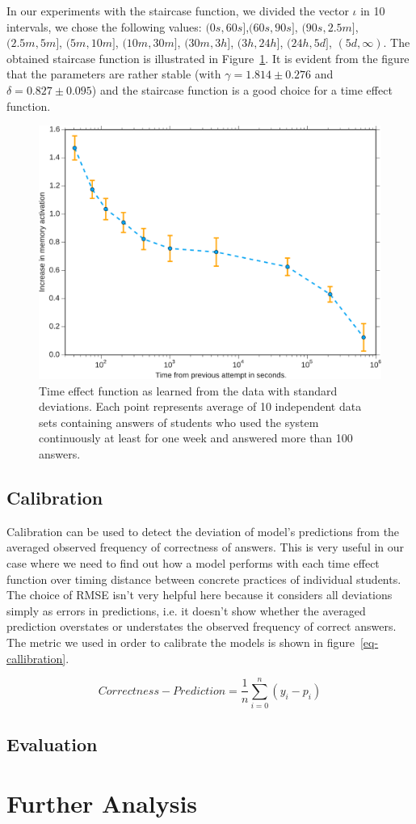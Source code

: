 In our experiments with the staircase function, we divided the vector $\iota$ in 10 intervals, we chose the following values: $(0s, 60s]$,$(60s, 90s]$, $(90s, 2.5m]$, $(2.5m, 5m]$, $(5m, 10m]$, $(10m, 30m]$, $(30m, 3h]$, $(3h, 24h]$, $(24h, 5d]$, $(5d, \infty)$. The obtained staircase function is illustrated in Figure~\ref{learned-time-effect-function}. It is evident from the figure that the parameters are rather stable (with $\gamma = 1.814 \pm 0.276$ and $\delta = 0.827 \pm 0.095$) and the staircase function is a good choice for a time effect function.

\begin{figure}[htbp]
  \centering
  \includegraphics[width=\textwidth]{img/learned-time-effect-function}
  \caption{Time effect function as learned from the data with standard deviations. Each point represents average of 10 independent data sets containing answers of students who used the system continuously at least for one week and answered more than 100 answers.}
  \label{learned-time-effect-function}
\end{figure}

\subsection{Calibration}

Calibration can be used to detect the deviation of model's predictions from the averaged observed frequency of correctness of answers. This is very useful in our case where we need to find out how a model performs with each time effect function over timing distance between concrete practices of individual students. The choice of RMSE isn't very helpful here because it considers all deviations simply as errors in predictions, i.e. it doesn't show whether the averaged prediction overstates or understates the observed frequency of correct answers. The metric we used in order to calibrate the models is shown in figure~\ref{eq-callibration}.

\begin{equation} \label{eq-callibration}
  \mathit{Correctness} - \mathit{Prediction} = \frac{1}{n} \sum_{i=0}^{n} (y_i - p_i)
\end{equation}

\subsection{Evaluation}
\label{evaluation}

\section{Further Analysis}
\label{further-analysis}

